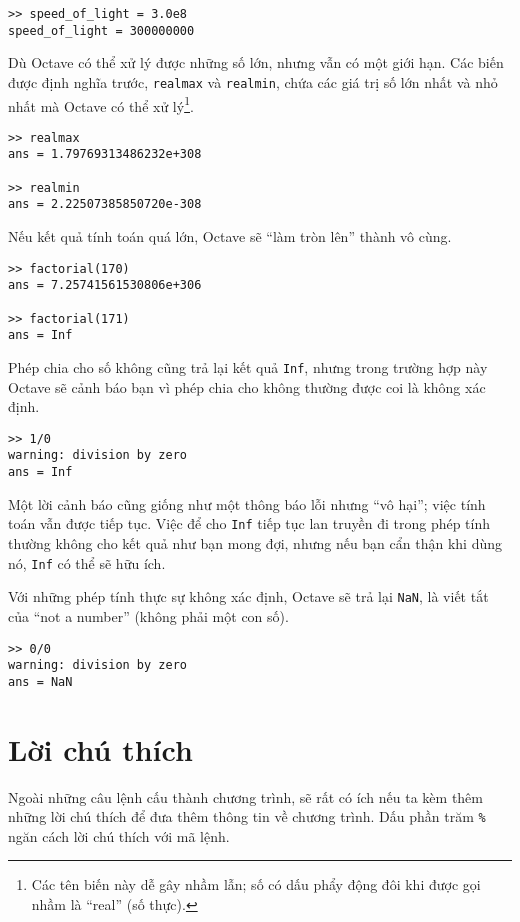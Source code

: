 \documentclass[12pt]{book}
\begin{document}
\begin{verbatim}
>> speed_of_light = 3.0e8
speed_of_light = 300000000
\end{verbatim}
%
Dù Octave có thể xử lý được những số lớn, nhưng vẫn có một giới hạn.
Các biến được định nghĩa trước, {\tt realmax} và {\tt realmin}, chứa các 
giá trị số lớn nhất và nhỏ nhất mà Octave có thể xử lý\footnote{Các
tên biến này dễ gây nhầm lẫn; số có dấu phẩy động đôi khi được gọi
nhầm là ``real'' (số thực).}.

\begin{verbatim}
>> realmax
ans = 1.79769313486232e+308

>> realmin
ans = 2.22507385850720e-308
\end{verbatim}
%
Nếu kết quả tính toán quá lớn, Octave sẽ ``làm tròn lên'' thành
vô cùng.

\begin{verbatim}
>> factorial(170)
ans = 7.25741561530806e+306

>> factorial(171)
ans = Inf
\end{verbatim}
%
Phép chia cho số không cũng trả lại kết quả {\tt Inf}, nhưng trong 
trường hợp này Octave sẽ cảnh báo bạn vì phép chia cho không
thường được coi là không xác định.

\begin{verbatim}
>> 1/0
warning: division by zero
ans = Inf
\end{verbatim}
%
Một lời cảnh báo cũng giống như một thông báo lỗi nhưng ``vô hại''; 
việc tính toán vẫn được tiếp tục. Việc để cho {\tt Inf} tiếp tục lan 
truyền đi trong phép tính thường không cho kết quả như bạn mong đợi,
nhưng nếu bạn cẩn thận khi dùng nó, {\tt Inf} có thể sẽ hữu ích.

Với những phép tính thực sự không xác định, Octave sẽ trả lại {\tt NaN},
là viết tắt của ``not a number'' (không phải một con số).

\begin{verbatim}
>> 0/0
warning: division by zero
ans = NaN
\end{verbatim}



\section{Lời chú thích}

Ngoài những câu lệnh cấu thành chương trình, sẽ rất có ích nếu ta kèm
thêm những lời chú thích để đưa thêm thông tin về chương trình. Dấu
phần trăm {\tt \%} ngăn cách lời chú thích với mã lệnh.
\end{document}
